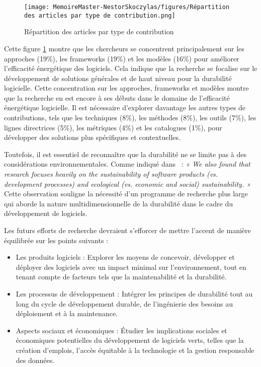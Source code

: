 \begin{figure}[H]
    \centering
    \texttt{[image: MemoireMaster-NestorSkoczylas/figures/Répartition des articles par type de contribution.png]}
    \caption{Répartition des articles par type de contribution}
    \label{fig:repartition-article-type-contribution}
\end{figure}

Cette figure \ref{fig:repartition-article-type-contribution} montre que les chercheurs se concentrent principalement sur les approches (19\%), les frameworks (19\%) et les modèles (16\%) pour améliorer l'efficacité énergétique des logiciels. Cela indique que la recherche se focalise sur le développement de solutions générales et de haut niveau pour la durabilité logicielle. Cette concentration sur les approches, frameworks et modèles montre que la recherche en est encore à ses débuts dans le domaine de l'efficacité énergétique logicielle. Il est nécessaire d'explorer davantage les autres types de contributions, tels que les techniques (8\%), les méthodes (8\%), les outils (7\%), les lignes directrices (5\%), les métriques (4\%) et les catalogues (1\%), pour développer des solutions plus spécifiques et contextuelles.

Toutefois, il est essentiel de reconnaître que la durabilité ne se limite pas à des considérations environnementales. Comme indiqué dans~\cite{SustainableStratifiedTheory} : \emph{« We also found that research focuses heavily on the sustainability of software products (vs. development processes) and ecological (vs. economic and social) sustainability. »} Cette observation souligne la nécessité d'un programme de recherche plus large qui aborde la nature multidimensionnelle de la durabilité dans le cadre du développement de logiciels.


Les futurs efforts de recherche devraient s'efforcer de mettre l'accent de manière équilibrée sur les points suivants :

\begin{itemize}
    \item Les produits logiciels : Explorer les moyens de concevoir, développer et déployer des logiciels avec un impact minimal sur l'environnement, tout en tenant compte de facteurs tels que la maintenabilité et la durabilité.
    \item Les processus de développement : Intégrer les principes de durabilité tout au long du cycle de développement durable, de l'ingénierie des besoins au déploiement et à la maintenance.
    \item Aspects sociaux et économiques : Étudier les implications sociales et économiques potentielles du développement de logiciels verts, telles que la création d'emplois, l'accès équitable à la technologie et la gestion responsable des données.
\end{itemize}



